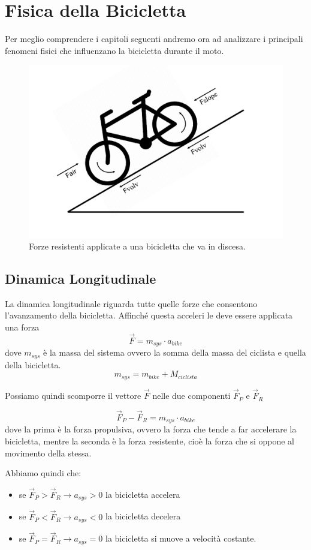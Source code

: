 \documentclass[class=article]{standalone}
\begin{document}
	
	\section{Fisica della Bicicletta}
	Per meglio comprendere i capitoli seguenti andremo ora ad analizzare i principali fenomeni fisici che influenzano la bicicletta durante il moto.
	
	\begin{center}
		\begin{figure}[h!]
			\centering\includegraphics[width=.8\textwidth]{img/potenze}
			\caption[]{Forze resistenti applicate a una bicicletta che va in discesa.}
			\label{fig:potenze}
		\end{figure}
	\end{center}
	
	\subsection{Dinamica Longitudinale}
	La dinamica longitudinale riguarda tutte quelle forze che consentono l'avanzamento della bicicletta. Affinché questa acceleri le deve essere applicata una forza
	\[\vec{F}=m_{sys}\cdot a_{bike}\]
	dove \(m_{sys}\) è la massa del sistema ovvero la somma della massa del ciclista e quella della bicicletta.
	\[m_{sys}=m_{bike}+M_{ciclista}\]
	
	Possiamo quindi scomporre il vettore \(\vec{F}\) nelle due componenti \(\vec{F}_{P}\) e \(\vec{F}_{R}\)
	
	\[\vec{F}_{P}-\vec{F}_{R}=m_{sys}\cdot a_{bike}\]
	dove la prima è la forza propulsiva, ovvero la forza che tende a far accelerare la bicicletta, mentre la seconda è la forza resistente, cioè la forza che si oppone al movimento della stessa.
	
	Abbiamo quindi che:
	\begin{itemize}
		\item se \(\vec{F}_{P}>\vec{F}_{R} \rightarrow a_{sys}>0\) la bicicletta accelera
		\item se \(\vec{F}_{P}<\vec{F}_{R} \rightarrow a_{sys}<0\) la bicicletta decelera
		\item se \(\vec{F}_{P}=\vec{F}_{R} \rightarrow a_{sys}=0\) la bicicletta si muove a velocità costante.
	\end{itemize}
	
\end{document}

